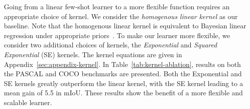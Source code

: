 \begin{table}[t]
  \caption{Performance of different kernels on the PASCAL- and COCO- benchmarks. Notably, both the Exponential and SE kernels significantly outperform the linear kernel, confirming the need for a flexible learner. Measured in mIoU (higher is better). Best results are in bold.}\vspace{-3mm}
  \centering {}
  \label{tab:kernel-ablation}
  \vspace{-3mm}
\end{table}


Going from a linear few-shot learner to a more flexible function requires an appropriate choice of kernel. We consider the \emph{homogenous linear kernel} as our baseline. Note that the homogenous linear kernel is equivalent to Bayesian linear regression under appropriate priors~\cite{Rasmussen2006}. To make our learner more flexible, we consider two additional choices of kernels, the \emph{Exponential} and \emph{Squared Exponential} (SE) kernels. The kernel equations are given in Appendix~\ref{sec:appendix-kernel}. In Table~\ref{tab:kernel-ablation}, results on both the PASCAL and COCO benchmarks are presented. Both the Exponential and SE kernels greatly outperform the linear kernel, with the SE kernel leading to a mean gain of 5.5 in mIoU. These results show the benefit of a more flexible and scalable learner.

